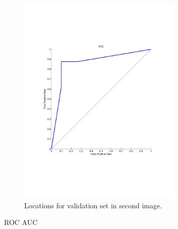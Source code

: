 \documentclass{article}
\begin{document}
\begin{figure}
 \centering
 \includegraphics[trim=80 150 70 50 , clip, width=0.7\textwidth]{../figures/roc.pdf}
 \caption{Locations for validation set in second image.}
 \label{fig:roc}
\end{figure}
ROC
AUC
\end{document}
